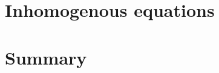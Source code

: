 \documentclass[12pt]{article}
\begin{document}
\section*{Inhomogenous equations}

\section*{Summary}
  
\end{document}
